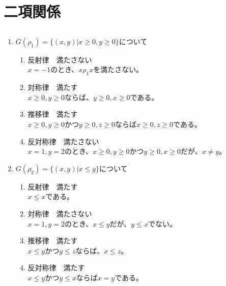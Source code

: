 \documentclass{jsarticle}
\begin{document}
\section{二項関係}

\subsection{}
\begin{enumerate}
\item $G(\rho_1)=\{(x,y)|x\geq0,y\geq0\}$について
\begin{enumerate}
\item 反射律　満たさない\\
$x=-1$のとき、$x\rho_1 x$を満たさない。
\item 対称律　満たす\\
$x\geq0,y\geq0$ならば、$y\geq0,x\geq0$である。
\item 推移律　満たす\\
$x\geq0,y\geq0$かつ$y\geq0,z\geq0$ならば$x\geq0,z\geq0$である。
\item 反対称律　満たさない\\
$x=1,y=2$のとき、$x\geq 0,y\geq0$かつ$y\geq0,x\geq0$だが、$x\neq y$。
\end{enumerate}

\item $G(\rho_2)=\{(x,y)|x\leq y\}$について
\begin{enumerate}
\item 反射律　満たす\\
$x\leq x$である。
\item 対称律　満たさない\\
$x=1,y=2$のとき、$x\leq y$だが、$y\leq x$でない。
\item 推移律　満たす\\
$x\leq y$かつ$y\leq z$ならば、$x\leq z$。
\item 反対称律　満たす\\
$x\leq y$かつ$y\leq x$ならば$x=y$である。
\end{enumerate}


\end{enumerate}
\end{document}
